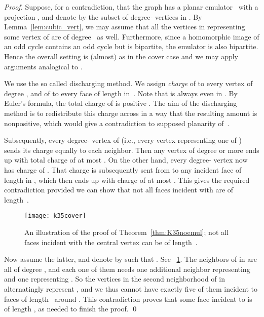 \documentclass[envcountsect,envcountsame]{llncs}
\renewenvironment{accumulate}{}{}
\begin{document}
\begin{accumulate}
\begin{proof}
Suppose, for a contradiction, that the graph  has a planar
emulator~ with a projection , 
and denote by  the subset of degree- vertices in .
By Lemma~\ref{lem:cubic_vert}, we may assume that all the vertices in 
representing some vertex of  are of degree~ as well.
Furthermore, since a homomorphic image of an odd cycle contains an odd cycle
but  is bipartite,
the emulator  is also bipartite.
Hence the overall setting is (almost) as in the cover case and we may apply
arguments analogical to \cite{cit:hunekecov,cit:20years}.

We use the so called discharging method.
We assign {\em charge} of  to every vertex  of degree ,
and of  to every face  of length  in~.
Note that  is always even in .
By Euler's formula, the total charge of  is positive .
The aim of the discharging method is to redistribute this charge across 
in a way that the resulting amount is nonpositive,
which would give a contradiction to supposed planarity of~.

Subsequently, every degree- vertex of  (i.e., every vertex representing one of )
sends its charge equally  to each neighbor.
Then any vertex  of degree  or more ends up with total charge
of at most .
On the other hand, every degree- vertex  now has charge of .
That charge is subsequently sent from  to any incident face
of length  in ,
which then ends up with charge of at most .
This gives the required contradiction provided we can show that not all
faces incident with  are of length~.

\begin{figure}[tb]
\centering
\texttt{[image: k35cover]}
\caption{An illustration of the proof of Theorem~\ref{thm:K35noemul};
	not all faces incident with the central vertex  can be of length~.}
\label{fig:K35cov}
\end{figure}

Now assume the latter,
and denote by  such that .
See \figurename~\ref{fig:K35cov}.
The neighbors of  in  are all of degree , and each one of them needs one
additional neighbor representing  and one representing .
So the vertices in the second neighborhood of  in  
alternatingly represent ,
and we thus cannot have exactly five of them incident to faces of
length~ around .
This contradiction proves that some face incident to  is of length
, as needed to finish the proof.
\qed\end{proof}

\end{accumulate}
\end{document}
